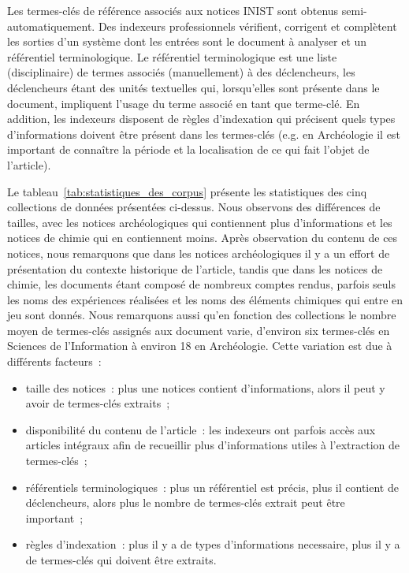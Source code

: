   Les termes-clés de référence associés aux notices INIST sont obtenus
  semi-automatiquement. Des indexeurs professionnels vérifient, corrigent et
  complètent les sorties d'un système dont les entrées sont le document à
  analyser et un référentiel terminologique. Le référentiel terminologique est
  une liste (disciplinaire) de termes associés (manuellement) à des
  déclencheurs, les déclencheurs étant des unités textuelles qui, lorsqu'elles
  sont présente dans le document, impliquent l'usage du terme associé en tant
  que terme-clé. En addition, les indexeurs disposent de règles d'indexation qui
  précisent quels types d'informations doivent être présent dans les termes-clés
  (e.g. en Archéologie il est important de connaître la période et la
  localisation de ce qui fait l'objet de l'article).

  Le tableau~\ref{tab:statistiques_des_corpus} présente les statistiques des
  cinq collections de données présentées ci-dessus. Nous observons des
  différences de tailles, avec les notices archéologiques qui contiennent plus
  d'informations et les notices de chimie qui en contiennent moins. Après
  observation du contenu de ces notices, nous remarquons que dans les notices
  archéologiques il y a un effort de présentation du contexte historique de
  l'article, tandis que dans les notices de chimie, les documents étant
  composé de nombreux comptes rendus, parfois seuls les noms des expériences
  réalisées et les noms des éléments chimiques qui entre en jeu sont donnés.
  Nous remarquons aussi qu'en fonction des collections le nombre moyen de
  termes-clés assignés aux document varie, d'environ six termes-clés en Sciences
  de l'Information à environ 18 en Archéologie. Cette variation est due à
  différents facteurs~:
  \begin{itemize}
    \item{taille des notices~: plus une notices contient d'informations, alors
          il peut y avoir de termes-clés extraits~;}
    \item{disponibilité du contenu de l'article~: les indexeurs ont parfois
          accès aux articles intégraux afin de recueillir plus d'informations
          utiles à l'extraction de termes-clés~;}
    \item{référentiels terminologiques~: plus un référentiel est précis, plus il
          contient de déclencheurs, alors plus le nombre de termes-clés extrait
          peut être important~;}
    \item{règles d'indexation~: plus il y a de types d'informations necessaire,
          plus il y a de termes-clés qui doivent être extraits.}
  \end{itemize}
